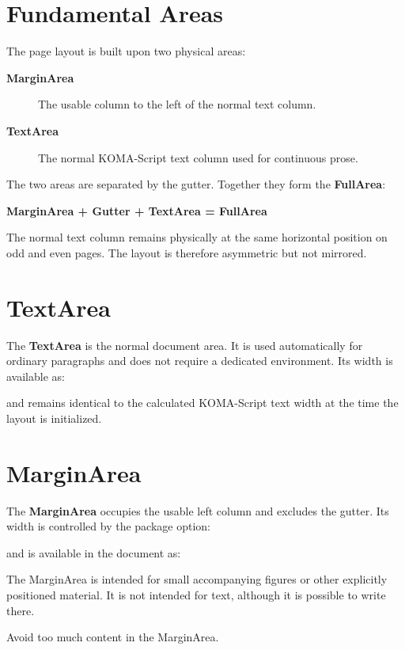 \documentclass[
11pt,
a4paper,
oneside
]{scrbook}
\begin{document}
\section{Fundamental Areas}
The page layout is built upon two physical areas:
\begin{description}
	\item[\textbf{MarginArea}]
	The usable column to the left of the normal text column.
	
	\item[\textbf{TextArea}]
	The normal KOMA-Script text column used for continuous prose.
\end{description}
The two areas are separated by the gutter.
Together they form the \textbf{FullArea}:
\begin{note}
	\textbf{MarginArea + Gutter + TextArea = FullArea}
\end{note}
The normal text column remains physically at the same horizontal position on
odd and even pages.
The layout is therefore asymmetric but not mirrored.

\section{TextArea}

The \textbf{TextArea} is the normal document area.
It is used automatically for ordinary paragraphs and does not require a
dedicated environment.
Its width is available as:




and remains identical to the calculated KOMA-Script text width at the time
the layout is initialized.

\section{MarginArea}

The \textbf{MarginArea} occupies the usable left column and excludes the
gutter.
Its width is controlled by the package option:





and is available in the document as:




The MarginArea is intended for small accompanying figures or other explicitly
positioned material. It is not intended for text, although it is possible to write there.

\begin{MarginArea}
	\begin{warning}
		Avoid too much content in the MarginArea.
	\end{warning}
\end{MarginArea}
\end{document}

